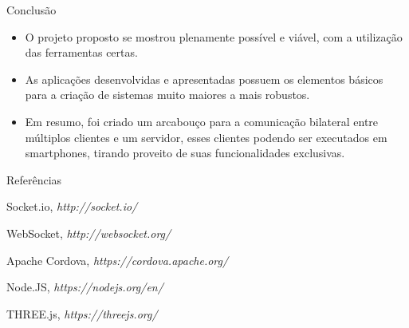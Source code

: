 \documentclass[final,hyperref={pdfpagelabels=false}]{beamer}
\begin{document}
\begin{frame}[t]
\begin{columns}[t]
\begin{column}{.465\textwidth}



\begin{block}{Conclusão}

\begin{itemize}
\item O projeto proposto se mostrou plenamente possível e viável, com a utilização das ferramentas certas.
\item As aplicações desenvolvidas e apresentadas possuem os elementos básicos para a criação de sistemas muito maiores a mais robustos.
\item Em resumo, foi criado um arcabouço para a comunicação bilateral entre múltiplos clientes e um servidor, esses clientes podendo ser executados em smartphones, tirando proveito de suas funcionalidades exclusivas.
\end{itemize}

\end{block}


\begin{block}{Referências}

\begin{thebibliography}{99}

 Socket.io,
\textit{http://socket.io/}

 WebSocket,
\textit{http://websocket.org/}

 Apache Cordova,
\textit{https://cordova.apache.org/}

 Node.JS,
\textit{https://nodejs.org/en/}

 THREE.js,
\textit{https://threejs.org/}

\end{thebibliography}
\end{block}




\end{column}
\end{columns}
\end{frame}
\end{document}
